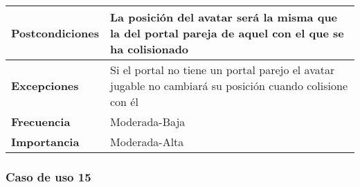 \begin{longtable}{l|l}
\begin{minipage}{0.25\columnwidth}
\textbf{Postcondiciones} 
\end{minipage}
&
\begin{minipage}{0.65\columnwidth}
La posición del avatar será la misma que la del portal pareja de aquel con el que se ha colisionado
\end{minipage}
\\ \hline

\begin{minipage}{0.25\columnwidth}
\textbf{Excepciones} 
\end{minipage}
&
\begin{minipage}{0.65\columnwidth}
Si el portal no tiene un portal parejo el avatar jugable no cambiará su posición cuando colisione con él 
\end{minipage}
\\ \hline

\begin{minipage}{0.25\columnwidth}
\textbf{Frecuencia} 
\end{minipage}
&
\begin{minipage}{0.65\columnwidth}
Moderada-Baja
\end{minipage}
\\ \hline

\begin{minipage}{0.25\columnwidth}
\textbf{Importancia} 
\end{minipage}
&
\begin{minipage}{0.65\columnwidth}
Moderada-Alta
\end{minipage}
\\ \hline
\end{longtable}

\subsubsection{Caso de uso 15}

